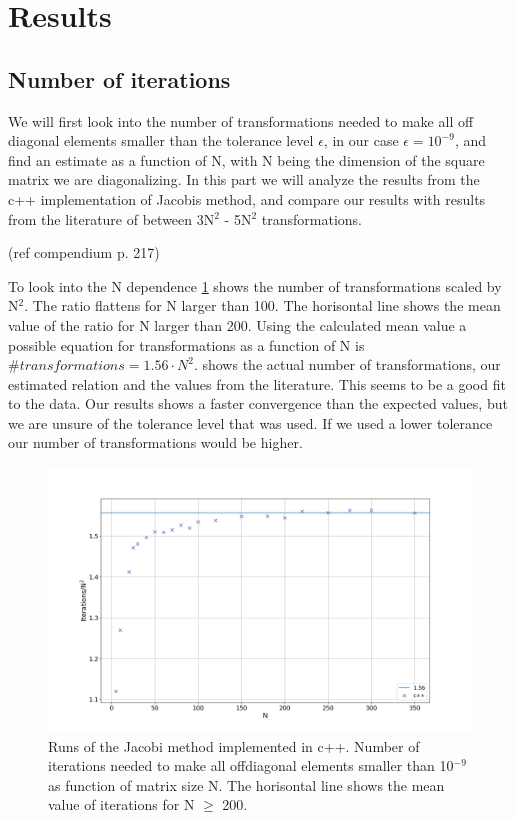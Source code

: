 \section{Results}


\subsection{Number of iterations}

We will first look into the number of transformations needed to make all off
diagonal elements smaller than the tolerance level $\epsilon$, in our case
$\epsilon = 10^{-9}$, and find an estimate as a function of N, with N being the
dimension of the square matrix we are diagonalizing. In this part we will
analyze the results from the c++ implementation of Jacobis method, and compare
our results with results from the literature of between 3N$^2$ - 5N$^2$
transformations.

(ref compendium p. 217)

To look into the N dependence \cref{fig:iterations_scaled} shows the number of
transformations scaled by N$^2$. The ratio flattens for N larger than 100. The
horisontal line shows the mean value of the ratio for N larger than 200. Using
the calculated mean value a possible equation for transformations as a function
of N is $\#transformations = 1.56\cdot N^2$.  shows the
actual number of transformations, our estimated relation and the values from the literature.
This seems to be a
good fit to the data. Our results shows a faster convergence than the expected
values, but we are unsure of the tolerance level that was used. If we used a
lower tolerance our number of transformations would be higher.


\begin{figure}[H]
  \centering
  \includegraphics[width=1.0\textwidth]{../figures/iterations_compare_n2.png}
  \caption{Runs of the Jacobi method implemented in c++. Number of iterations
  needed to make all offdiagonal elements smaller than 10$^{-9}$ as function of
  matrix size N. The horisontal line shows the mean value of iterations for
  N $\geq$ 200.}

  \label{fig:iterations_scaled}
\end{figure}


